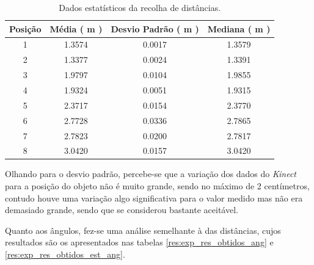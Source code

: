 \begin{table}[!h]
\begin{center}
\begin{tabular} { c c c c }
Posição & Média ( m ) & Desvio Padrão ( m ) & Mediana ( m ) \\
\hline
1 & 1.3574 & 0.0017 & 1.3579 \\
2 & 1.3377 & 0.0024 & 1.3391\\
3 & 1.9797 & 0.0104 & 1.9855 \\
4 & 1.9324 & 0.0051 & 1.9315 \\
5 & 2.3717 & 0.0154 & 2.3770 \\
6 & 2.7728 & 0.0336 & 2.7865 \\
7 & 2.7823 & 0.0200 & 2.7817 \\
8 & 3.0420 & 0.0157 & 3.0420 \\
\hline
\end{tabular}
	\caption{Dados estatísticos da recolha de distâncias.}
	\label{res:exp_res_obtidos_est}
\end{center}
\end{table}

Olhando para o desvio padrão, percebe-se que a variação dos dados do \emph{Kinect} para a posição do objeto não é muito grande, sendo no máximo de 2 centímetros, contudo houve uma variação algo significativa para o valor medido mas não era demasiado grande, sendo que se considerou bastante aceitável.


Quanto aos ângulos, fez-se uma análise semelhante à das distâncias, cujos resultados são os apresentados nas tabelas \ref{res:exp_res_obtidos_ang} e \ref{res:exp_res_obtidos_est_ang}.

